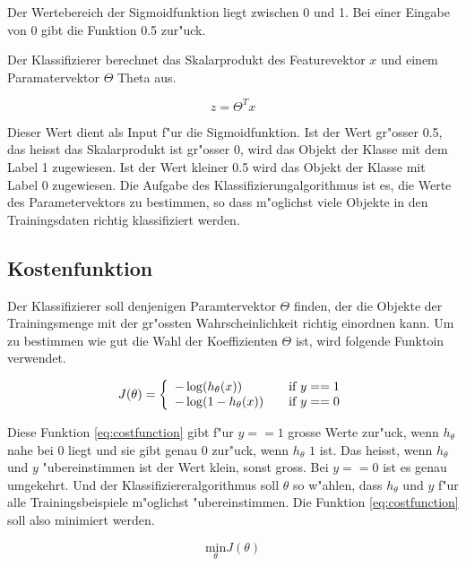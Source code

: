 \documentclass[12pt,a4paper,twoside]{article}
\begin{document}
Der Wertebereich der Sigmoidfunktion liegt zwischen 0 und 1. Bei einer Eingabe von 0 gibt die Funktion 0.5 zur"uck.

Der Klassifizierer berechnet das Skalarprodukt des Featurevektor $x$ und einem Paramatervektor $\Theta$ Theta aus.

\[
z = \Theta^T x
\]

Dieser Wert dient als Input f"ur die Sigmoidfunktion. Ist der Wert gr"osser 0.5, das heisst das Skalarprodukt ist gr"osser 0, wird das Objekt der Klasse mit dem Label 1 zugewiesen. Ist der Wert kleiner 0.5 wird das Objekt der Klasse mit Label 0 zugewiesen. Die Aufgabe des Klassifizierungalgorithmus ist es, die Werte des Parametervektors zu bestimmen, so dass m"oglichst viele Objekte in den Trainingsdaten richtig klassifiziert werden. 

\subsection{Kostenfunktion}
\label{sec:costfunction}

Der Klassifizierer soll denjenigen Paramtervektor $\Theta$ finden, der die Objekte der Trainingsmenge mit der gr"ossten Wahrscheinlichkeit richtig einordnen kann. Um zu bestimmen wie gut die Wahl der Koeffizienten $\Theta$ ist, wird folgende Funktoin verwendet.

\begin{equation}
  \label{eq:costfunction}
  J(\theta) = \left \{
    \begin{array}{l l}
      -\log(h_{\theta} (x)) & \quad \text{if $y==1$}\\
      -\log(1-h_{\theta} (x)) & \quad \text{if $y==0$}
    \end{array} \right.
\end{equation}

Diese Funktion \ref{eq:costfunction} gibt f"ur $y==1$ grosse Werte zur"uck, wenn $h_{\theta}$ nahe bei $0$ liegt und sie gibt genau $0$ zur"uck, wenn $h_{\theta}$ $1$ ist. Das heisst, wenn $h_{\theta}$ und $y$ "ubereinstimmen ist der Wert klein, sonst gross. Bei $y==0$ ist es genau umgekehrt. Und der Klassifiziereralgorithmus soll $\theta$ so w"ahlen, dass $h_{\theta}$ und $y$  f"ur alle Trainingsbeispiele m"oglichst "ubereinstimmen. Die Funktion \ref{eq:costfunction} soll also minimiert werden.

\begin{equation}
  \label{eq:minimize}
  \underset{\theta}{\text{min}} J(\theta)
\end{equation}
\end{document}
